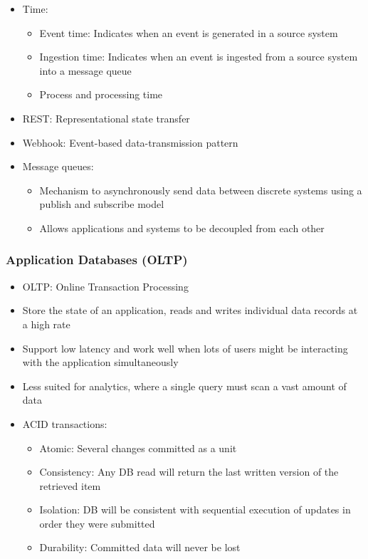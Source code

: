 \documentclass[11pt]{scrartcl}
\begin{document}
\begin{itemize}
\begin{itemize}
	\end{itemize}
	\item Time:
	\begin{itemize}
		\item Event time: Indicates when an event is generated in a source system
		\item Ingestion time: Indicates when an event is ingested from a source system into a message queue
		\item Process and processing time
	\end{itemize}
	\item REST: Representational state transfer
	\item Webhook: Event-based data-transmission pattern
	\item Message queues: 
	\begin{itemize}
		\item Mechanism to asynchronously send data between discrete systems using a publish and subscribe model
		\item Allows applications and systems to be decoupled from each other
	\end{itemize}
\end{itemize}

\subsubsection*{Application Databases (OLTP)}
\begin{itemize}
	\item OLTP: Online Transaction Processing
	\item Store the state of an application, reads and writes individual data records at a high rate
	\item Support low latency and work well when lots of users might be interacting with the application simultaneously
	\item Less suited for analytics, where a single query must scan a vast amount of data
	\item ACID transactions:
	\begin{itemize}
		\item Atomic: Several changes committed as a unit
		\item Consistency: Any DB read will return the last written version of the retrieved item
		\item Isolation: DB will be consistent with sequential execution of updates in order they were submitted
		\item Durability: Committed data will never be lost
	\end{itemize}
\end{itemize}
\end{document}
